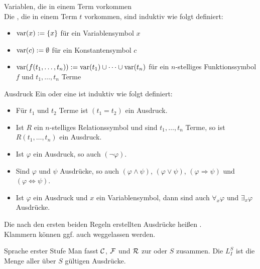 \begin{Def}{Variablen, die in einem Term vorkommen}\\
    Die , die in einem Term $t$ vorkommen, sind induktiv
    wie folgt definiert:
    \begin{itemize}
        \item
        $\text{var}(x) := \{x\}$ für ein Variablensymbol $x$

        \item
        $\text{var}(c) := \emptyset$ für ein Konstantensymbol $c$

        \item
        $\text{var}(f(t_1, \dotsc, t_n)) := \text{var}(t_1) \cup \dotsb \cup \text{var}(t_n)$
        für ein $n$-stelliges Funktionssymbol $f$ und $t_1, \dotsc, t_n$ Terme
    \end{itemize}
\end{Def}

\linie

\begin{Def}{Ausdruck}
    Ein  oder eine  ist induktiv wie folgt definiert:
    \begin{itemize}
        \item
        Für $t_1$ und $t_2$ Terme ist $(t_1 = t_2)$ ein Ausdruck.

        \item
        Ist $R$ ein $n$-stelliges Relationssymbol und sind $t_1, \dotsc, t_n$
        Terme, so ist $R(t_1, \dotsc, t_n)$ ein Ausdruck.

        \item
        Ist $\varphi$ ein Ausdruck, so auch $(\lnot\varphi)$.

        \item
        Sind $\varphi$ und $\psi$ Ausdrücke, so auch $(\varphi \land \psi)$,
        $(\varphi \lor \psi)$, $(\varphi \Rightarrow \psi)$ und $(\varphi \Leftrightarrow \psi)$.

        \item
        Ist $\varphi$ ein Ausdruck und $x$ ein Variablensymbol, dann sind auch
        $\forall_x \varphi$ und $\exists_x \varphi$ Ausdrücke.
    \end{itemize}
    Die nach den ersten beiden Regeln erstellten Ausdrücke heißen .\\
    Klammern können ggf. auch weggelassen werden.
\end{Def}

\begin{Def}{Sprache erster Stufe}
    Man fasst $\mathcal{C}$, $\mathcal{F}$ und $\mathcal{R}$ zur  oder  $S$ zusammen.
    Die  $L_I^S$
    ist die Menge aller über $S$ gültigen Ausdrücke.
\end{Def}

